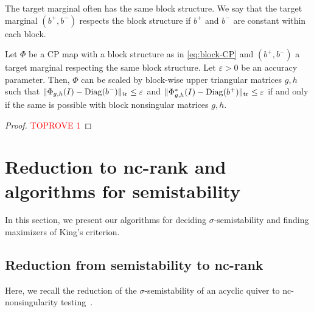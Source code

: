 \documentclass[a4paper,11pt]{article}
\numberwithin{equation}{section}
\newcommand{\eps}{\varepsilon}
\DeclareMathOperator{\tr}{tr}
\DeclareMathOperator{\Diag}{Diag}
\DeclarePairedDelimiter{\norm}{\lVert}{\rVert}
\begin{document}
The target marginal often has the same block structure.
We say that the target marginal $(b^+, b^-)$ respects the block structure if $b^+$ and $b^-$ are constant within each block.

\begin{lemma}\label{lem:block-marginal}
    Let  $\Phi$ be a CP map with a block structure as in \eqref{eq:block-CP} and $(b^+, b^-)$ a target marginal respecting the same block structure.
    Let $\eps > 0$ be an accuracy parameter.
    Then, $\Phi$ can be scaled by block-wise upper triangular matrices $g, h$ such that $\norm{\Phi_{g,h}(I) - \Diag(b^-)}_{\tr} \leq \eps$ and $\norm{\Phi_{g,h}^*(I) - \Diag(b^+)}_{\tr} \leq \eps$ if and only if the same is possible with block nonsingular matrices $g, h$.
\end{lemma}
\begin{proof}\textcolor{red}{TOPROVE 1}\end{proof}

\section{Reduction to nc-rank and algorithms for semistability}\label{sec:ss}
In this section, we present our algorithms for deciding $\sigma$-semistability and finding maximizers of King's criterion.

\subsection{Reduction from semistability to nc-rank}
Here, we recall the reduction of the $\sigma$-semistability of an acyclic quiver to nc-nonsingularity testing~\citep{Derksen2017}.
\end{document}
